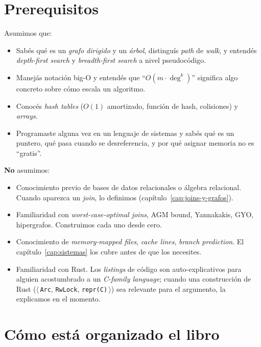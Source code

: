 \section*{Prerequisitos}

Asumimos que:

\begin{itemize}
    \item Sabés qué es un \emph{grafo dirigido} y un \emph{árbol},
    distinguís \emph{path} de \emph{walk}, y entendés \emph{depth-first
    search} y \emph{breadth-first search} a nivel pseudocódigo.
    \item Manejás notación big-O y entendés que ``\(O(m \cdot
    \deg^k)\)'' significa algo concreto sobre cómo escala un algoritmo.
    \item Conocés \emph{hash tables} (\(O(1)\) amortizado, función de
    hash, colisiones) y \emph{arrays}.
    \item Programaste alguna vez en un lenguaje de sistemas y sabés
    qué es un puntero, qué pasa cuando se desreferencia, y por qué
    asignar memoria no es ``gratis''.
\end{itemize}

\noindent\textbf{No} asumimos:

\begin{itemize}
    \item Conocimiento previo de bases de datos relacionales o álgebra
    relacional. Cuando aparezca un \emph{join}, lo definimos
    (capítulo~\ref{cap:joins-y-grafos}).
    \item Familiaridad con \emph{worst-case-optimal joins}, AGM bound,
    Yannakakis, GYO, hipergrafos. Construimos cada uno desde cero.
    \item Conocimiento de \emph{memory-mapped files}, \emph{cache
    lines}, \emph{branch prediction}. El capítulo~\ref{cap:sistemas}
    los cubre antes de que los necesites.
    \item Familiaridad con Rust. Los \emph{listings} de código son
    auto-explicativos para alguien acostumbrado a un \emph{C-family
    language}; cuando una construcción de Rust ($\langle$\,\texttt{Arc},
    \texttt{RwLock}, \texttt{repr(C)}\,$\rangle$) sea relevante para el
    argumento, la explicamos en el momento.
\end{itemize}

\section*{Cómo está organizado el libro}

